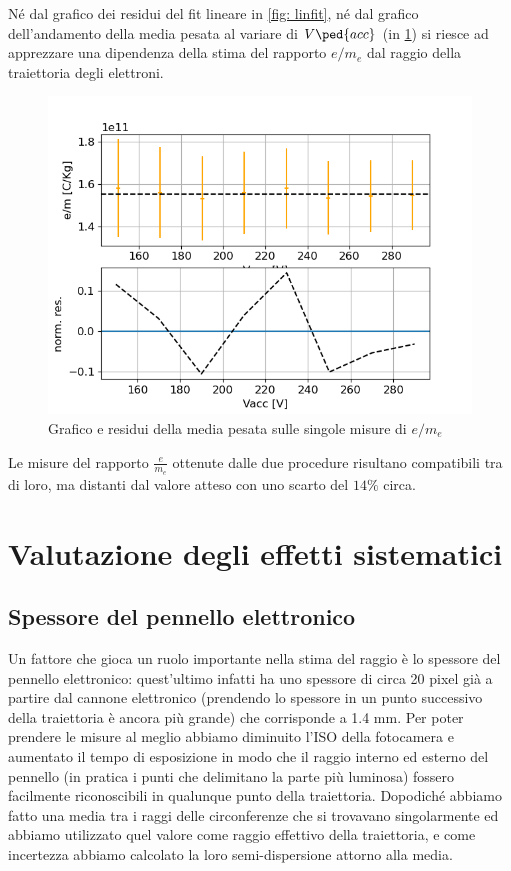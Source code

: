 \documentclass[10pt, a4paper, italian]{article}
\begin{document}
Né dal grafico dei residui del fit lineare in \cref{fig: linfit}, né dal
grafico dell'andamento della media pesata al variare di $V\ped{acc}$ (in
\cref{fig: medpes}) si riesce ad apprezzare una dipendenza della stima del
rapporto $e/m_e$ dal raggio della traiettoria degli elettroni.

\begin{figure}
\includegraphics[width=\textwidth]{medpes}
\caption{Grafico e residui della media pesata sulle singole misure di $e/m_e$
\label{fig: medpes}}
\end{figure}

Le misure del rapporto $\frac{e}{m_e}$ ottenute dalle due procedure risultano
compatibili tra di loro, ma distanti dal valore atteso con uno scarto del
$14 \percent$ circa. 

\section{Valutazione degli effetti sistematici}

\subsection{Spessore del pennello elettronico}
Un fattore che gioca un ruolo importante nella stima del raggio è lo spessore
del pennello elettronico: quest'ultimo infatti ha uno spessore di circa 20
pixel già a partire dal cannone elettronico (prendendo lo spessore in un
punto successivo della traiettoria è ancora più grande) che corrisponde
a 1.4 mm. Per poter prendere le misure al meglio abbiamo diminuito l'ISO
della fotocamera e aumentato il tempo di esposizione in modo che il raggio
interno ed esterno del pennello (in pratica i punti che delimitano la parte
più luminosa) fossero facilmente riconoscibili in qualunque punto della
traiettoria. Dopodiché abbiamo fatto una media tra i raggi delle circonferenze che si trovavano singolarmente ed abbiamo utilizzato quel valore come raggio effettivo della traiettoria, e come incertezza abbiamo calcolato la loro semi-dispersione attorno alla media.
\end{document}
